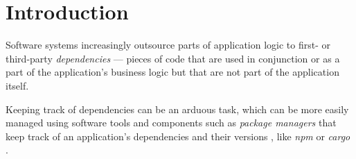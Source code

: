 \section{Introduction}

Software systems increasingly outsource parts of application logic to first- or third-party \emph{dependencies} --- pieces of code that are used in conjunction or as a part of the application's business logic but that are not part of the application itself. \needsRef

Keeping track of dependencies can be an arduous task, which can be more easily managed using software tools and components such as \emph{package managers} that keep track of an application's dependencies and their versions \needsRef, like \emph{npm} or \emph{cargo} \cite{tools:pkg-mngr:npm,tools:pkg-mngr:cargo}.